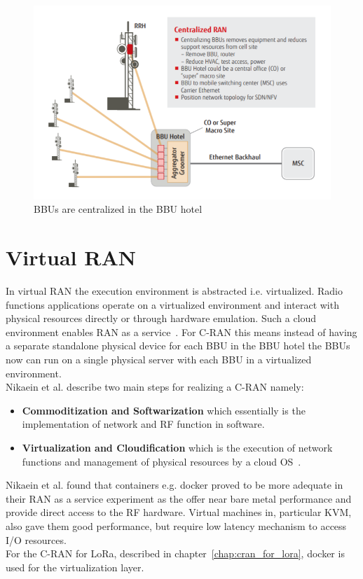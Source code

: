 \begin{figure}[H]
    \centering
    \includegraphics[width=1\textwidth]{figures/CRAN.png}
    \caption{BBUs are centralized in the BBU hotel~\cite{fujitsu}}
    \label{fig:CRAN}
\end{figure}

\section{Virtual RAN}
In virtual RAN the execution environment is abstracted i.e. virtualized.
Radio functions applications operate on a virtualized environment and interact
with physical resources directly or through hardware emulation.
Such a cloud environment enables RAN as a service~\cite{Nikaein2015}.
For C-RAN this means instead of having a separate standalone physical device
for each BBU in the BBU hotel the BBUs now can run on a single physical server with each
BBU in a virtualized environment. \\
Nikaein et al. describe two main steps for realizing a C-RAN namely:
\begin{itemize}
    \item \textbf{Commoditization and Softwarization} which essentially is the implementation of network and RF function in software.
    \item \textbf{Virtualization and Cloudification} which is the execution of network functions and management of physical resources by a cloud OS~\cite{Nikaein2015}.
\end{itemize}

Nikaein et al. found that containers e.g. docker proved to be more adequate in their RAN as a service experiment as the offer near bare metal performance
and provide direct access to the RF hardware. Virtual machines in, particular KVM, also gave them good performance, but require low latency mechanism to access I/O resources.
\\
For the C-RAN for LoRa, described in chapter~\ref{chap:cran_for_lora}, docker is used for the virtualization layer.

